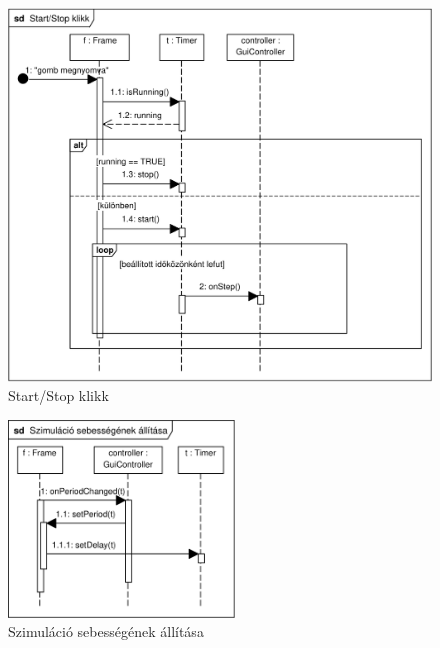\begin{figure}[h]
\begin{center}
\includegraphics[width=17cm]{chapters/chapter11/pdfs/11_startstop.pdf}
\caption{Start/Stop klikk}
\label{fig:startstop}
\end{center}
\end{figure}

\begin{figure}[h]
\begin{center}
\includegraphics[width=6cm]{chapters/chapter11/pdfs/12_szimseb.pdf}
\caption{Szimuláció sebességének állítása}
\label{fig:szimseb}
\end{center}
\end{figure}